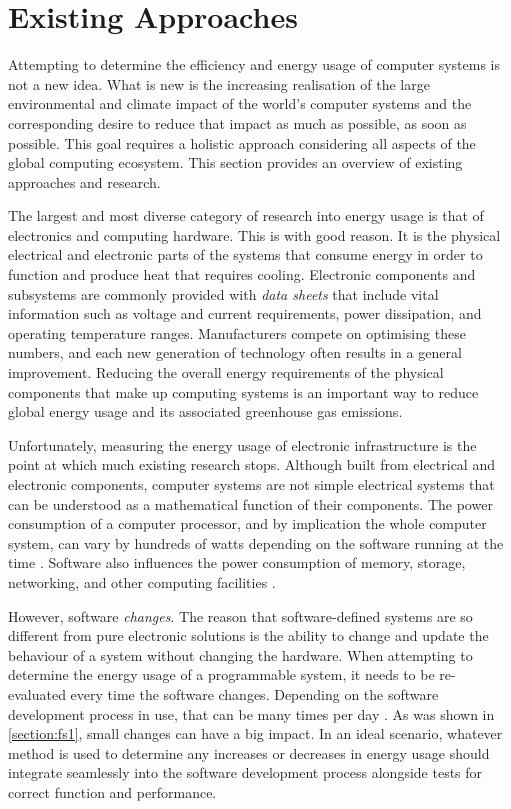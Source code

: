 \section{Existing Approaches}
\label{testrig:existing}

Attempting to determine the efficiency and energy usage of computer systems is not a new idea. What is new is the increasing realisation of the large environmental and climate impact of the world's computer systems and the corresponding desire to reduce that impact as much as possible, as soon as possible. This goal requires a holistic approach considering all aspects of the global computing ecosystem. This section provides an overview of existing approaches and research.

The largest and most diverse category of research into energy usage is that of electronics and computing hardware. This is with good reason. It is the physical electrical and electronic parts of the systems that consume energy in order to function and produce heat that requires cooling. Electronic components and subsystems are commonly provided with \emph{data sheets} that include vital information such as voltage and current requirements, power dissipation, and operating temperature ranges. Manufacturers compete on optimising these numbers, and each new generation of technology often results in a general improvement. Reducing the overall energy requirements of the physical components that make up computing systems is an important way to reduce global energy usage and its associated greenhouse gas emissions.

Unfortunately, measuring the energy usage of electronic infrastructure is the point at which much existing research stops. Although built from electrical and electronic components, computer systems are not simple electrical systems that can be understood as a mathematical function of their components. The power consumption of a computer processor, and by implication the whole computer system, can vary by hundreds of watts depending on the software running at the time \citep{derBauer2023}. Software also influences the power consumption of memory, storage, networking, and other computing facilities \citep{Basmadjian2012}.

However, software \emph{changes}. The reason that software-defined systems are so different from pure electronic solutions is the ability to change and update the behaviour of a system without changing the hardware. When attempting to determine the energy usage of a programmable system, it needs to be re-evaluated every time the software changes. Depending on the software development process in use, that can be many times per day \citep{Shahin2017}. As was shown in \autoref{section:fs1}, small changes can have a big impact. In an ideal scenario, whatever method is used to determine any increases or decreases in energy usage should integrate seamlessly into the software development process alongside tests for correct function and performance.

